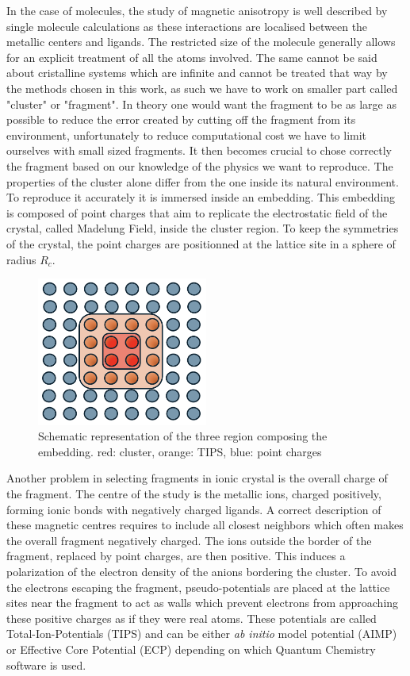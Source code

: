 \documentclass[12pt]{report}
\numberwithin{equation}{section}
\begin{document}
In the case of molecules, the study of magnetic anisotropy is well described by single molecule calculations as these interactions are localised between the metallic centers and ligands. 
The restricted size of the molecule generally allows for an explicit treatment of all the atoms involved.
The same cannot be said about cristalline systems which are infinite and cannot be treated that way by the methods chosen in this work, as such we have to work on smaller part called "cluster" or "fragment".
In theory one would want the fragment to be as large as possible to reduce the error created by cutting off the fragment from its environment, unfortunately to reduce computational cost we have to limit ourselves with small sized fragments. 
It then becomes crucial to chose correctly the fragment based on our knowledge of the physics we want to reproduce.
The properties of the cluster alone differ from the one inside its natural environment. To reproduce it accurately it is immersed inside an embedding. 
This embedding is composed of point charges that aim to replicate the electrostatic field of the crystal, called Madelung Field, inside the cluster region. 
To keep the symmetries of the crystal, the point charges are positionned at the lattice site in a sphere of radius $R_c$. 
\begin{figure}[!ht]
    \centering
    \includegraphics[width=0.5\textwidth]{Images/Bain.png}
    \caption{Schematic representation of the three region composing the embedding. red: cluster, orange: TIPS, blue: point charges}
    \label{Bain}
\end{figure}
Another problem in selecting fragments in ionic crystal is the overall charge of the fragment.
The centre of the study is the metallic ions, charged positively, forming ionic bonds with negatively charged ligands.
A correct description of these magnetic centres requires to include all closest neighbors which often makes the overall fragment negatively charged.
The ions outside the border of the fragment, replaced by point charges, are then positive. This induces a polarization of the electron density of the anions bordering the cluster.
To avoid the electrons escaping the fragment, pseudo-potentials are placed at the lattice sites near the fragment to act as walls which prevent electrons from approaching these positive charges as if they were real atoms.
These potentials are called Total-Ion-Potentials (TIPS) and can be either \textit{ab initio} model potential (AIMP) or Effective Core Potential (ECP) depending on which Quantum Chemistry software is used.
\end{document}
